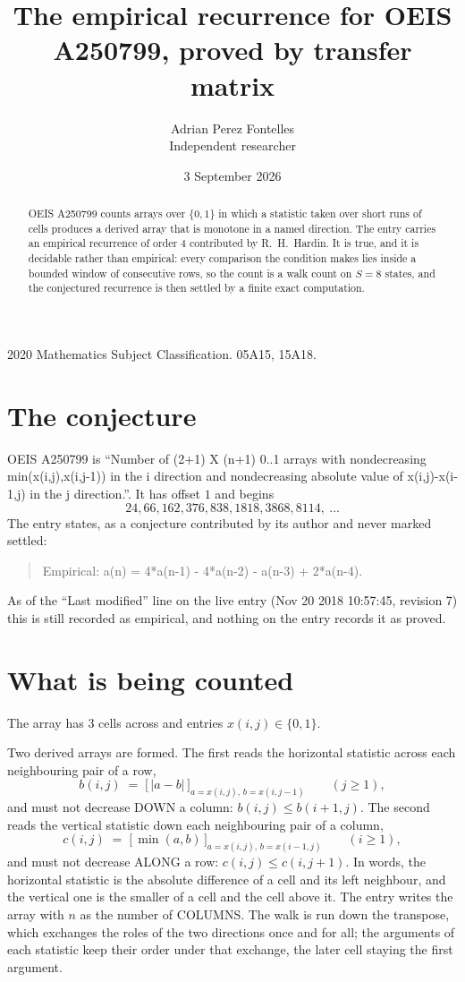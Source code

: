\documentclass[11pt,a4paper]{article}
\title{The empirical recurrence for OEIS A250799, proved by transfer matrix}
\author{Adrian Perez Fontelles\\ \small Independent researcher}
\date{3 September 2026}
\theoremstyle{plain}
\theoremstyle{definition}
\begin{document}
\maketitle

\begin{abstract}
OEIS A250799 counts arrays over $\{0,1\}$ in which a statistic taken over short runs
of cells produces a derived array that is monotone in a named direction. The entry carries an
empirical recurrence of order $4$ contributed by R.~H.~Hardin. It is true, and it is
decidable rather than empirical: every comparison the condition makes lies inside a bounded
window of consecutive rows, so the count is a walk count on $S=8$ states, and the
conjectured recurrence is then settled by a finite exact computation.
\end{abstract}

\noindent\small 2020 Mathematics Subject Classification. 05A15, 15A18.\normalsize

\section{The conjecture}

OEIS A250799 is ``Number of (2+1) X (n+1) 0..1 arrays with nondecreasing min(x(i,j),x(i,j-1)) in the i direction and nondecreasing absolute value of x(i,j)-x(i-1,j) in the j direction.''. It has offset $1$ and begins
\[
24, 66, 162, 376, 838, 1818, 3868, 8114,\ \dots
\]
The entry states, as a conjecture contributed by its author and never marked settled:
\begin{quote}
Empirical: a(n) = 4*a(n-1) - 4*a(n-2) - a(n-3) + 2*a(n-4).
\end{quote}
As of the ``Last modified'' line on the live entry (Nov 20 2018 10:57:45, revision 7) this is still
recorded as empirical, and nothing on the entry records it as proved.

\section{What is being counted}

The array has $3$ cells across and entries $x(i,j)\in\{0,1\}$.

Two derived arrays are formed. The first reads the horizontal statistic across each
neighbouring pair of a row,
\[
b(i,j)\;=\;\bigl[\,\lvert a-b\rvert\,\bigr]_{a=x(i,j),\,b=x(i,j-1)}\qquad (j\ge1),
\]
and must not decrease DOWN a column: $b(i,j)\le b(i{+}1,j)$. The second reads the vertical
statistic down each neighbouring pair of a column,
\[
c(i,j)\;=\;\bigl[\,\min(a,b)\,\bigr]_{a=x(i,j),\,b=x(i{-}1,j)}\qquad (i\ge1),
\]
and must not decrease ALONG a row: $c(i,j)\le c(i,j{+}1)$. In words, the horizontal statistic
is the absolute difference of a cell and its left neighbour, and the vertical one is
the smaller of a cell and the cell above it. The entry writes the array with $n$ as the number of COLUMNS. The walk is run down the transpose, which exchanges the roles of the two directions once and for all; the arguments of each statistic keep their order under that exchange, the later cell staying the first argument.
\end{document}
